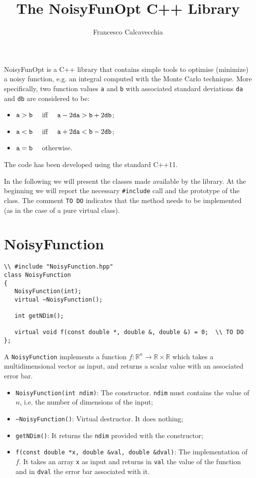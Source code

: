 \documentclass[11pt,a4paper,twoside]{article}
\title{The NoisyFunOpt C++ Library}
\author{Francesco Calcavecchia}
\begin{document}
\maketitle

NoisyFunOpt is a C++ library that contains simple tools to optimise (minimize) a noisy function, e.g. an integral computed with the Monte Carlo technique.
More specifically, two function values \verb+a+ and \verb+b+ with associated standard deviations \verb+da+ and \verb+db+ are considered to be:
\begin{itemize}
\item $\verb+a+ > \verb+b+ \quad $ iff $ \quad \verb+a+ - 2 \verb+da+ > \verb+b+ + 2 \verb+db+$;
\item $\verb+a+ < \verb+b+ \quad $ iff $ \quad \verb+a+ + 2 \verb+da+ < \verb+b+ - 2 \verb+db+$;
\item $\verb+a+ = \verb+b+ \quad $ otherwise.
\end{itemize}

The code has been developed using the standard C++11.

In the following we will present the classes made available by the library.
At the beginning we will report the necessary \verb+#include+ call and the prototype of the class.
The comment \verb+TO DO+ indicates that the method needs to be implemented (as in the case of a pure virtual class).


\section{NoisyFunction}
\label{sec:NoisyFunction}

\begin{lstlisting}
\\ #include "NoisyFunction.hpp"
class NoisyFunction
{
   NoisyFunction(int);
   virtual ~NoisyFunction();

   int getNDim();

   virtual void f(const double *, double &, double &) = 0;  \\ TO DO
};
\end{lstlisting}

A \verb+NoisyFunction+ implements a function $f:\mathbb{R}^{n} \rightarrow \mathbb{R} \times \mathbb{R}$ which takes a multidimensional vector as input, and returns a scalar value with an associated error bar.

\begin{itemize}
\item \verb+NoisyFunction(int ndim)+: The constructor. \verb+ndim+ must contains the value of $n$, i.e. the number of dimensions of the input;
\item \verb+~NoisyFunction()+: Virtual destructor. It does nothing;
\item \verb+getNDim()+: It returns the \verb+ndim+ provided with the constructor;
\item \verb+f(const double *x, double &val, double &dval)+: The implementation of $f$. It takes an array \verb+x+ as input and returns in \verb+val+ the value of the function and in \verb+dval+ the error bar associated with it.
\end{itemize}
\end{document}
